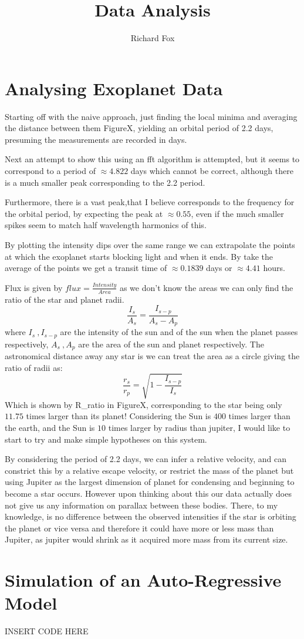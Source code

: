 \documentclass[a4paper,12pt,notitlepage]{article}
\title{Data Analysis}
\author{Richard Fox}
\date{}
\begin{document}
\maketitle

\section{Analysing Exoplanet Data}

Starting off with the naive approach, just finding the local minima and averaging the distance between them FigureX, yielding an orbital period of 2.2 days, presuming the measurements are recorded in days. 

Next an attempt to show this using an fft algorithm is attempted, but it seems to correspond to a period of $\approx 4.822$ days which cannot be correct, although there is a much smaller peak corresponding to  the 2.2 period.

Furthermore, there is a vast peak,that I believe corresponds to the frequency for the orbital period,  by expecting the peak at $\approx 0.55$, even if the much smaller spikes seem to match half wavelength harmonics of this.

By plotting the intensity dips over the same range we can extrapolate the points at which the exoplanet starts blocking light and when it ends. By take the average of the points we get a transit time of $\approx 0.1839$ days or $\approx 4.41$ hours.

Flux is given by $flux = \frac{Intensity}{Area}$ as we don't know the areas we can only find the ratio of the star and planet radii. 
$$ \frac{I_s}{A_s} = \frac{I_{s-p}}{A_s-A_p} $$
where $I_s\   ,  I_{s-p}$ are the intensity of the sun and of the sun when the planet passes respectively, $A_s\  ,  A_p$ are the area of the sun and planet respectively. The astronomical distance away any star is we can treat the area as a circle giving the ratio of radii as:
$$\frac{r_s}{r_p} = \sqrt{1-\frac{I_{s-p}}{I_s}}$$
Which is shown by R\_ratio in FigureX, corresponding to the star being only $11.75$ times larger than its planet! Considering the Sun is $400$ times larger than the earth, and the Sun is $10$ times larger by radius than jupiter, I would like to start to try and make simple hypotheses on this system.

By considering the period of 2.2 days, we can infer a relative velocity, and can constrict this by a relative escape velocity, or restrict the mass of the planet but using Jupiter as the largest dimension of planet for condensing and beginning to become a star occurs. However upon thinking about this our data actually does not give us any information on parallax between these bodies. There, to my knowledge, is no difference between the observed intensities if the star is orbiting the planet or vice versa and therefore it could have more or less mass than Jupiter, as jupiter would shrink as it acquired more mass from its current size.


\section{Simulation of an Auto-Regressive Model}

INSERT CODE HERE
\end{document}
